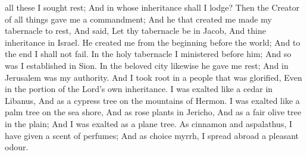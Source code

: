  all these I sought rest; And in whose inheritance shall I lodge? Then the Creator of all things gave me a commandment; And he that created me made my tabernacle to rest, And said, Let thy tabernacle be in Jacob, And thine inheritance in Israel. He created me from the beginning before the world; And to the end I shall not fail. In the holy tabernacle I ministered before him; And so was I established in Sion. In the beloved city likewise he gave me rest; And in Jerusalem was my authority. And I took root in a people that was glorified, Even in the portion of the Lord’s own inheritance. I was exalted like a cedar in Libanus, And as a cypress tree on the mountains of Hermon. I was exalted like a palm tree on the sea shore, And as rose plants in Jericho, And as a fair olive tree in the plain; And I was exalted as a plane tree. As cinnamon and aspalathus, I have given a scent of perfumes; And as choice myrrh, I spread abroad a pleasant odour.


